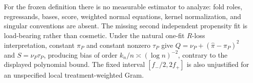 For the frozen definition there is no measurable estimator to analyze: fold roles, regressands, bases, score, weighted normal equations, kernel normalization, and singular conventions are absent.  The missing second independent propensity fit is load-bearing rather than cosmetic.  Under the natural one-fit \(R\)-loss interpretation, constant \(\pi_P\) and constant nonzero \(\tau_P\) give \(Q=\nu_P+(\widehat\pi-\pi_P)^2\) and \(S=\nu_P\tau_P\), producing bias of order \(k_n/n\asymp(\log n)^{-2}\), contrary to the displayed polynomial bound.  The fixed interval \([f_-/2,2f_+]\) is also unjustified for an unspecified local treatment-weighted Gram.